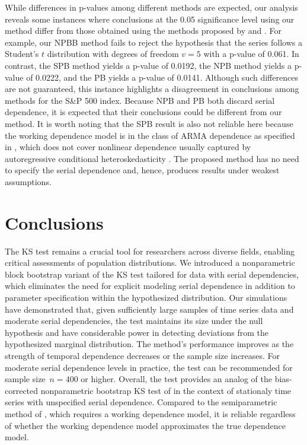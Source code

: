 \documentclass[APA,Times1COL]{WileyNJDv5} %
\begin{document}
While differences in p-values among different methods are expected, our analysis
reveals some instances where conclusions at the 0.05 significance level
using our method differ from those obtained using the methods proposed by
\citet{babu2004goodness} and \citet{zeimbekakis2022misuses}.
For example, our NPBB method fails to reject the
hypothesis that the series follows a Student's $t$ distribution with degrees of
freedom $v = 5$ with a p-value of 0.061. In contrast, 
the SPB method yields a p-value of 0.0192,
the NPB method yields a p-value of 0.0222, and the PB yields a p-value of
0.0141. Although such differences are not guaranteed, this
instance highlights a disagreement in conclusions among methods for the S\&P 500
index. Because NPB and PB both discard serial dependence, it is expected that
their conclusions could be different from our method. It is worth noting that
the SPB result is also not reliable here because the working dependence model is
in the class of ARMA dependence as specified in \citet{zeimbekakis2022misuses},
which does not cover nonlinear dependence usually captured by autoregressive
conditional heteroskedasticity \citep{engle1995arch}. The proposed method has
no need to specify the serial dependence and, hence, produces results under
weakest assumptions.


\section{Conclusions}\label{sec:conclusion}

The KS test remains a crucial tool for researchers across diverse fields,
enabling critical assessments of population distributions. We introduced a
nonparametric block bootstrap variant of the KS test tailored for data with
serial dependencies, which eliminates the need for explicit modeling serial
dependence in addition to parameter specification within the hypothesized
distribution. Our simulations have demonstrated that, given
sufficiently large samples of time series data and moderate serial dependencies,
the test maintains its size under the null hypothesis and have considerable
power in detecting deviations from the hypothesized marginal distribution. The
method's performance improves as the strength of temporal dependence decreases
or the sample size increases. For moderate serial dependence levels in practice,
the test can be recommended for sample size~$n = 400$ or higher.
Overall, the test provides an analog of the bias-corrected nonparametric
bootstrap KS test of \citet{babu2004goodness} in the context of stationaly time
series with unspecified serial dependence. Compared to the semiparametric method
of \citet{zeimbekakis2022misuses}, which requires a working dependence model, it
is reliable regardless of whether the working dependence model approximates the
true dependence model.
\end{document}
